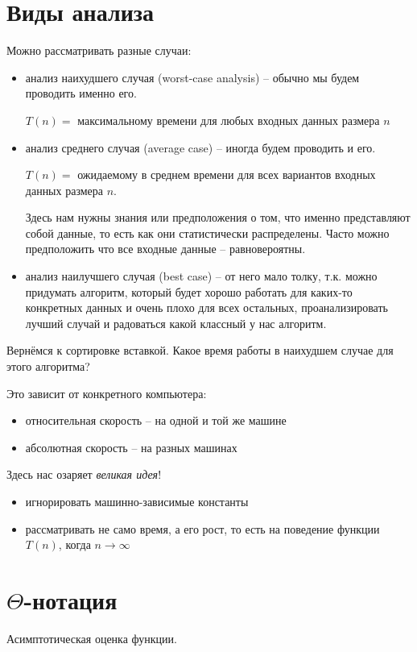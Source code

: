 \documentclass[a4paper,11pt]{article}
\begin{document}
\section{Виды анализа}
Можно рассматривать разные случаи:

\begin{itemize}
\item анализ наихудшего случая (worst-case analysis) -- обычно мы будем
  проводить именно его.

  $T(n) = $ максимальному времени для любых входных данных размера $n$

\item анализ среднего случая (average case) -- иногда будем проводить и его.

  $T(n) = $ ожидаемому в среднем времени для всех вариантов входных данных
  размера $n$.

  Здесь нам нужны знания или предположения о том, что именно представляют собой
  данные, то есть как они статистически распределены. Часто можно предположить
  что все входные данные -- равновероятны.

\item анализ наилучшего случая (best case) -- от него мало толку, т.к. можно
  придумать алгоритм, который будет хорошо работать для каких-то конкретных
  данных и очень плохо для всех остальных, проанализировать лучший случай и
  радоваться какой классный у нас алгоритм.
\end{itemize}

Вернёмся к сортировке вставкой. Какое время работы в наихудшем случае для этого
алгоритма?

Это зависит от конкретного компьютера:
\begin{itemize}
\item относительная скорость -- на одной и той же машине
\item абсолютная скорость -- на разных машинах
\end{itemize}

Здесь нас озаряет \emph{великая идея}!
\begin{itemize}
\item игнорировать машинно-зависимые константы
\item рассматривать не само время, а его рост, то есть на поведение функции
  $T(n)$, когда $n \rightarrow \infty$
\end{itemize}

\section{$\Theta$-нотация}
Асимптотическая оценка функции.
\end{document}
